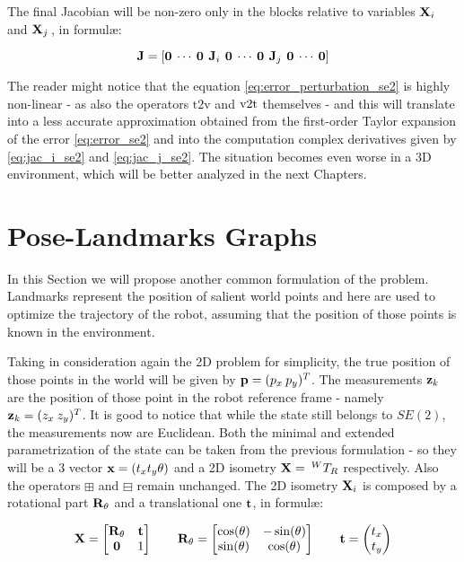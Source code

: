 \noindent The final Jacobian will be non-zero only in the blocks relative to variables $\mathbf{X}_i$ and $\mathbf{X}_j\,$, in formul\ae:

\begin{equation}
    \mathbf{J} = \left[\mathbf{0} \: \cdots \: \mathbf{0} \:\, \mathbf{J}_i \,\: \mathbf{0} \: \cdots \: \mathbf{0} \:\, \mathbf{J}_j \,\: \mathbf{0} \: \cdots \: \mathbf{0}\right]
    \label{eq:jac_se2}
\end{equation}

The reader might notice that the equation \ref{eq:error_perturbation_se2} is highly non-linear - as also the operators $\text{t2v}$ and $\v2t$ themselves - and this will translate into a less accurate approximation obtained from the first-order Taylor expansion of the error \ref{eq:error_se2} and into the computation complex derivatives given by \ref{eq:jac_i_se2} and \ref{eq:jac_j_se2}. The situation becomes even worse in a 3D environment, which will be better analyzed in the next Chapters. 

\section{Pose-Landmarks Graphs}\label{sec:pose_land_graph}
In this Section we will propose another common formulation of the problem. Landmarks represent the position of salient world points and here are used to optimize the trajectory of the robot, assuming that the position of those points is known in the environment. 

Taking in consideration again the 2D problem for simplicity, the true position of those points in the world will be given by $\mathbf{p} = (p_x\: p_y)^T$. The measurements $\mathbf{z}_k$ are the position of those point in the robot reference frame - namely $\mathbf{z}_k = (z_x\:z_y)^T$. It is good to notice that while the state still belongs to $SE(2)$, the measurements now are Euclidean. Both the minimal and extended parametrization of the state can be taken from the previous formulation - so they will be a $3$ vector $\mathbf{x} = (t_x t_y \theta)$ and a 2D isometry $\mathbf{X} =\: ^{W}T_{R}$ respectively. Also the operators $\boxplus$ and $\boxminus$ remain unchanged. The 2D isometry $\mathbf{X}_i$ is composed by a rotational part $\mathbf{R}_{\theta}$ and a translational one $\mathbf{t}$, in formul\ae:

\begin{align}
    \mathbf{X} = 
        \begin{bmatrix}
            \mathbf{R}_{\theta} & \mathbf{t} \\
            \mathbf{0} & 1
        \end{bmatrix} 
    \qquad
    \mathbf{R}_{\theta} = 
        \begin{bmatrix}
            \cos(\theta) & -\sin(\theta) \\
            \sin(\theta) & \cos(\theta)
        \end{bmatrix}
    \qquad
    \mathbf{t} = 
        \begin{pmatrix}
            t_x \\
            t_y
        \end{pmatrix}
    \label{eq:2d_isometry}
\end{align}

